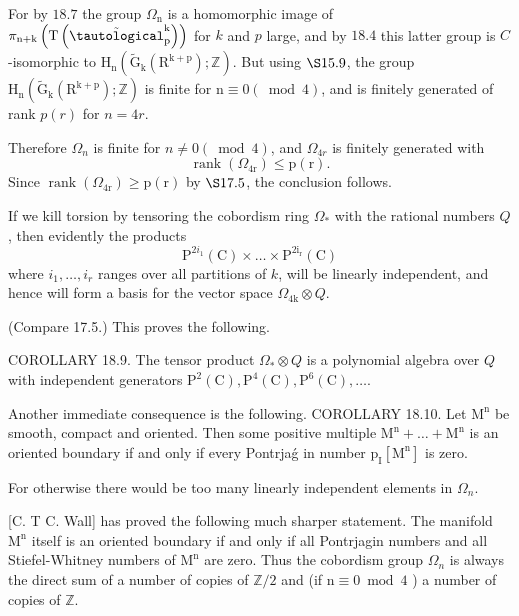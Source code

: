\documentclass[10pt]{article}
\begin{document}
For by $18.7$ the group $\Omega_{\mathrm{n}}$ is a homomorphic image of $\pi_{\mathrm{n}+\mathrm{k}}\left(\mathrm{T}\left(\tilde{\tautological}_{\mathrm{p}}^{\mathrm{k}}\right)\right)$ for $k$ and $p$ large, and by $18.4$ this latter group is $C$-isomorphic to $\mathrm{H}_{\mathrm{n}}\left(\widetilde{\mathrm{G}}_{\mathrm{k}}\left(\mathrm{R}^{\mathrm{k}+\mathrm{p}}\right) ; \mathbb{Z}\right)$. But using $\S 15.9$, the group $\mathrm{H}_{\mathrm{n}}\left(\widetilde{\mathrm{G}}_{\mathrm{k}}\left(\mathrm{R}^{\mathrm{k}+\mathrm{p}}\right) ; \mathbb{Z}\right)$ is finite for $\mathrm{n} \equiv 0(\bmod 4)$, and is finitely generated of rank $p(r)$ for $n=4 r$.

Therefore $\Omega_{n}$ is finite for $n \neq 0(\bmod 4)$, and $\Omega_{4 r}$ is finitely generated with
$$
\operatorname{rank}\left(\Omega_{4 \mathrm{r}}\right) \leq \mathrm{p}(\mathrm{r}) .
$$
Since $\operatorname{rank}\left(\Omega_{4 \mathrm{r}}\right) \geq \mathrm{p}(\mathrm{r})$ by $\S 17.5$, the conclusion follows.

If we kill torsion by tensoring the cobordism ring $\Omega_{*}$ with the rational numbers $Q$, then evidently the products
$$
\mathrm{P}^{2 i_{1}}(\mathrm{C}) \times \ldots \times \mathrm{P}^{2 \mathrm{i}_{\mathrm{r}}}(\mathrm{C})
$$
where $i_{1}, \ldots, i_{r}$ ranges over all partitions of $k$, will be linearly independent, and hence will form a basis for the vector space $\Omega_{4 \mathrm{k}} \otimes Q$.

(Compare 17.5.) This proves the following.

COROLLARY 18.9. The tensor product $\Omega_{*} \otimes Q$ is a polynomial algebra over $Q$ with independent generators $\mathrm{P}^{2}(\mathrm{C}), \mathrm{P}^{4}(\mathrm{C}), \mathrm{P}^{6}(\mathrm{C}), \ldots$.

Another immediate consequence is the following. COROLLARY 18.10. Let $\mathrm{M}^{\mathrm{n}}$ be smooth, compact and oriented. Then some positive multiple $\mathrm{M}^{\mathrm{n}}+\ldots+\mathrm{M}^{\mathrm{n}}$ is an oriented boundary if and only if every Pontrjaǵ in number $\mathrm{p}_{\mathrm{I}}\left[\mathrm{M}^{\mathrm{n}}\right]$ is zero.

For otherwise there would be too many linearly independent elements in $\Omega_{n} .$

[C. T C. Wall] has proved the following much sharper statement. The manifold $\mathrm{M}^{\mathrm{n}}$ itself is an oriented boundary if and only if all Pontrjagin numbers and all Stiefel-Whitney numbers of $\mathrm{M}^{\mathrm{n}}$ are zero. Thus the cobordism group $\Omega_{n}$ is always the direct sum of a number of copies of $\mathbb{Z} / 2$ and (if $\mathrm{n} \equiv 0 \bmod 4$ ) a number of copies of $\mathbb{Z}$.
\end{document}
